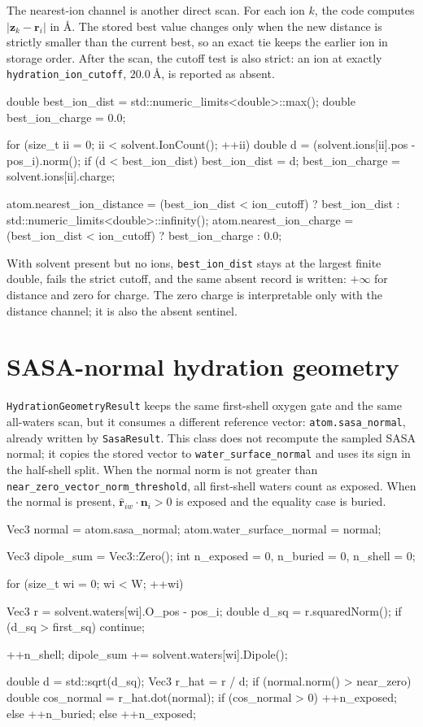 \documentclass[11pt]{article}
\newcommand{\code}[1]{\texttt{#1}}
\begin{document}
The nearest-ion channel is another direct scan. For each ion \(k\), the code
computes \(|\bm z_k-\bm r_i|\) in \(\si{\angstrom}\). The stored best value
changes only when the new distance is strictly smaller than the current best, so
an exact tie keeps the earlier ion in storage order. After the scan, the cutoff
test is also strict: an ion at exactly \code{hydration\_ion\_cutoff},
\(\SI{20.0}{\angstrom}\), is reported as absent.

\begin{codebox}
double best_ion_dist = std::numeric_limits<double>::max();
double best_ion_charge = 0.0;

for (size_t ii = 0; ii < solvent.IonCount(); ++ii) {
    double d = (solvent.ions[ii].pos - pos_i).norm();
    if (d < best_ion_dist) {
        best_ion_dist = d;
        best_ion_charge = solvent.ions[ii].charge;
    }
}

atom.nearest_ion_distance =
    (best_ion_dist < ion_cutoff)
    ? best_ion_dist : std::numeric_limits<double>::infinity();
atom.nearest_ion_charge =
    (best_ion_dist < ion_cutoff) ? best_ion_charge : 0.0;
\end{codebox}

With solvent present but no ions, \code{best\_ion\_dist} stays at the largest
finite double, fails the strict cutoff, and the same absent record is written:
\(+\infty\) for distance and zero for charge. The zero charge is interpretable
only with the distance channel; it is also the absent sentinel.

\section{SASA-normal hydration geometry}

\code{HydrationGeometryResult} keeps the same first-shell oxygen gate and the
same all-waters scan, but it consumes a different reference vector:
\code{atom.sasa\_normal}, already written by \code{SasaResult}. This class does
not recompute the sampled SASA normal; it copies the stored vector to
\code{water\_surface\_normal} and uses its sign in the half-shell split. When
the normal norm is not greater than \code{near\_zero\_vector\_norm\_threshold},
all first-shell waters count as exposed. When the normal is present,
\(\hat{\bm r}_{iw}\cdot\bm n_i>0\) is exposed and the equality case is buried.

\begin{codebox}
Vec3 normal = atom.sasa_normal;
atom.water_surface_normal = normal;

Vec3 dipole_sum = Vec3::Zero();
int n_exposed = 0, n_buried = 0, n_shell = 0;

for (size_t wi = 0; wi < W; ++wi) {
    Vec3 r = solvent.waters[wi].O_pos - pos_i;
    double d_sq = r.squaredNorm();
    if (d_sq > first_sq) continue;

    ++n_shell;
    dipole_sum += solvent.waters[wi].Dipole();

    double d = std::sqrt(d_sq);
    Vec3 r_hat = r / d;
    if (normal.norm() > near_zero) {
        double cos_normal = r_hat.dot(normal);
        if (cos_normal > 0) ++n_exposed;
        else                ++n_buried;
    } else {
        ++n_exposed;
    }
}
\end{codebox}
\end{document}
